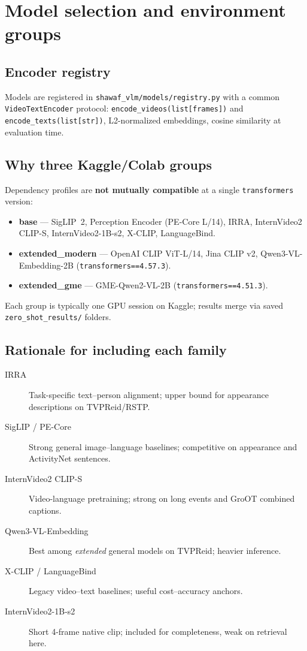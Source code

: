 \documentclass[11pt,a4paper]{article}
\begin{document}
\section{Model selection and environment groups}

\subsection{Encoder registry}
Models are registered in \texttt{shawaf\_vlm/models/registry.py} with a common \texttt{VideoTextEncoder} protocol: \texttt{encode\_videos(list[frames])} and \texttt{encode\_texts(list[str])}, L2-normalized embeddings, cosine similarity at evaluation time.

\subsection{Why three Kaggle/Colab groups}
Dependency profiles are \textbf{not mutually compatible} at a single \texttt{transformers} version:
\begin{itemize}[noitemsep]
  \item \textbf{base} --- SigLIP~2, Perception Encoder (PE-Core L/14), IRRA, InternVideo2 CLIP-S, InternVideo2-1B-s2, X-CLIP, LanguageBind.
  \item \textbf{extended\_modern} --- OpenAI CLIP ViT-L/14, Jina CLIP v2, Qwen3-VL-Embedding-2B (\texttt{transformers==4.57.3}).
  \item \textbf{extended\_gme} --- GME-Qwen2-VL-2B (\texttt{transformers==4.51.3}).
\end{itemize}
Each group is typically one GPU session on Kaggle; results merge via saved \texttt{zero\_shot\_results/} folders.

\subsection{Rationale for including each family}
\begin{description}
  \item[IRRA] Task-specific text--person alignment; upper bound for appearance descriptions on TVPReid/RSTP.
  \item[SigLIP / PE-Core] Strong general image--language baselines; competitive on appearance and ActivityNet sentences.
  \item[InternVideo2 CLIP-S] Video-language pretraining; strong on long events and GroOT combined captions.
  \item[Qwen3-VL-Embedding] Best among \emph{extended} general models on TVPReid; heavier inference.
  \item[X-CLIP / LanguageBind] Legacy video--text baselines; useful cost--accuracy anchors.
  \item[InternVideo2-1B-s2] Short 4-frame native clip; included for completeness, weak on retrieval here.
\end{description}
\end{document}
